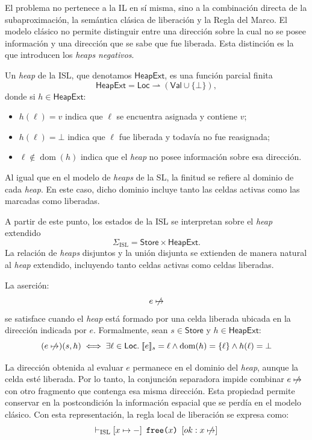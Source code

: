 \documentclass[a4paper,	11pt]{report}
\newif\ifdraft\drafttrue
\newcommand{\comm}[3]{\ifdraft{{\color{#1}[#2: #3]}}\fi}
\newcommand{\guido}[1]{\comm{blue}{Guido}{#1}}
\begin{document}
El problema no pertenece a la IL en sí misma,
sino a la combinación directa de la subaproximación,
la semántica clásica de liberación y la Regla del Marco.
El modelo clásico no permite distinguir entre una dirección sobre la cual no se posee información y una dirección que se sabe que fue liberada.
Esta distinción es la que introducen los \emph{heaps negativos}.

\begin{definicion}
\label{def:heap_ext}
Un \emph{heap} de la ISL,
que denotamos $\mathsf{HeapExt}$,
es una función parcial finita
$$\mathsf{HeapExt} = \mathsf{Loc} \rightharpoonup (\mathsf{Val} \cup \{\bot\}),$$
donde si $h \in \mathsf{HeapExt}$:
\begin{itemize}
  \item $h(\ell) = v$ indica que $\ell$ se encuentra asignada y contiene $v$;
  \item $h(\ell) = \bot$ indica que $\ell$ fue liberada y todavía no fue reasignada;
  \item $\ell \notin \operatorname{dom}(h)$ indica que el \emph{heap} no posee información sobre esa dirección.
\end{itemize}
\end{definicion}
Al igual que en el modelo de \emph{heaps} de la SL,
la finitud se refiere al dominio de cada \emph{heap}.
En este caso,
dicho dominio incluye tanto las celdas activas como las marcadas como liberadas.

A partir de este punto,
los estados de la ISL se interpretan sobre el \emph{heap} extendido
$$\Sigma_{\mathrm{ISL}} = \mathsf{Store} \times \mathsf{HeapExt}.$$
La relación de \emph{heaps} disjuntos y la unión disjunta se extienden de manera natural al \emph{heap} extendido,
incluyendo tanto celdas activas como celdas liberadas.

\begin{definicion}
\label{def:heap_negativo}
La aserción:
$$e \nmapsto$$
se satisface cuando el \emph{heap} está formado por una celda liberada ubicada en la dirección indicada por $e$.
Formalmente, sean $s \in \mathsf{Store}$ y $h \in \mathsf{HeapExt}$:
$$(e \nmapsto)(s,h) \iff \exists \ell \in \mathsf{Loc}. \;
[\![e]\!]_s = \ell \land \operatorname{dom}(h) = \{\ell\} \land h(\ell) = \bot$$
\end{definicion}

La dirección obtenida al evaluar $e$ permanece en el dominio del \emph{heap},
aunque la celda esté liberada.
Por lo tanto,
la conjunción separadora impide combinar $e \nmapsto$ con otro fragmento que contenga esa misma dirección.
Esta propiedad permite conservar en la postcondición la información espacial que se perdía en el modelo clásico.
Con esta representación,
la regla local de liberación se expresa como:
$$\vdash_{\mathrm{ISL}} \itriple{x \mapsto -}{\texttt{free(}x\texttt{)}}{ok : x \nmapsto}$$
\end{document}
